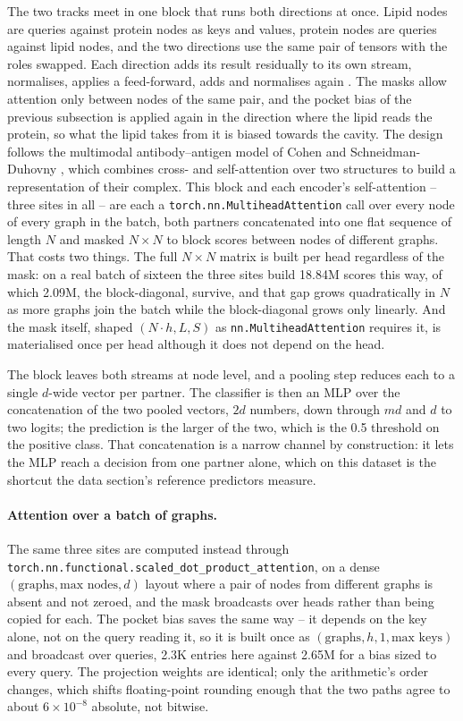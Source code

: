 The two tracks meet in one block that runs both directions at once. Lipid nodes are
queries against protein nodes as keys and values, protein nodes are queries against lipid
nodes, and the two directions use the same pair of tensors with the roles swapped. Each
direction adds its result residually to its own stream, normalises, applies a
feed-forward, adds and normalises again \cite{vaswani}. The masks
allow attention only between nodes of the same pair, and the pocket bias of the previous
subsection is applied again in the direction where the lipid reads the protein, so what
the lipid takes from it is biased towards the cavity. The design follows the multimodal
antibody--antigen model of Cohen and Schneidman-Duhovny \cite{abagcross}, which combines
cross- and self-attention over two structures to build a representation of their complex.
This block and each encoder's
self-attention -- three sites in all -- are each a
\texttt{torch.nn.MultiheadAttention} call over every node of every graph in the batch,
both partners concatenated into one flat sequence of length $N$ and masked $N \times N$
to block scores between nodes of different graphs. That costs two things. The full $N
\times N$ matrix is built per head regardless of the mask: on a real batch of sixteen the
three sites build 18.84M scores this way, of which 2.09M, the block-diagonal, survive,
and that gap grows quadratically in $N$ as more graphs join the batch while the
block-diagonal grows only linearly. And the mask itself, shaped $(N \cdot h, L, S)$ as
\texttt{nn.MultiheadAttention} requires it, is materialised once per head although it
does not depend on the head.

The block leaves both streams at node level, and a pooling step reduces each to a single
$d$-wide vector per partner. The classifier is then an MLP over the concatenation of the
two pooled vectors, $2d$ numbers, down through $md$ and $d$ to two logits; the prediction
is the larger of the two, which is the 0.5 threshold on the positive class. That
concatenation is a narrow channel by construction: it lets the MLP reach a decision from
one partner alone, which on this dataset is the shortcut the data section's reference
predictors measure.

\paragraph{Attention over a batch of graphs.} The same three sites are computed instead through
\texttt{torch.nn.functional.scaled\_dot\_product\_attention}, on a dense
$(\text{graphs}, \text{max nodes}, d)$ layout where a pair of nodes from different
graphs is absent and not zeroed, and the mask broadcasts over heads rather than
being copied for each. The pocket bias saves the same way -- it depends on the key
alone, not on the query reading it, so it is built once as $(\text{graphs}, h, 1,
\text{max keys})$ and broadcast over queries, 2.3K entries here against 2.65M for a bias
sized to every query. The projection weights are identical; only the
arithmetic's order changes, which shifts floating-point rounding enough that the two
paths agree to about $6 \times 10^{-8}$ absolute, not bitwise.

